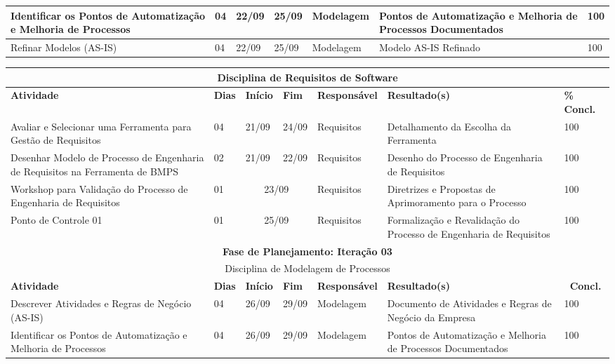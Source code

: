 \begin{landscape}
\begin{center}
\begin{tabular}{|m{6cm}|m{1cm}|m{1cm}|m{1cm}|m{4cm}|m{6cm}|m{2cm}|}
			Identificar os Pontos de Automatização e Melhoria de Processos & 04 & 22/09 & 25/09 & Modelagem & Pontos de Automatização e Melhoria de Processos Documentados & 100 \\ \hline
			Refinar Modelos (AS-IS) & 04 & 22/09 & 25/09 & Modelagem & Modelo AS-IS Refinado & 100 \\ \hline
			\end{tabular}
		\end{center}
		\begin{center}
			\begin{tabular}{|m{6cm}|m{1cm}|m{1cm}|m{1cm}|m{4cm}|m{6cm}|m{2cm}|}
			\hline
			\multicolumn{7}{|c|}{Disciplina de Requisitos de Software} \\
			\hline
			\textbf{Atividade} & \textbf{Dias} & \textbf{Início} & \textbf{Fim} & \textbf{Responsável} & \textbf{Resultado(s)} & \textbf{\% Concl.} \\ \hline
			Avaliar e Selecionar uma Ferramenta para Gestão de Requisitos & 04 & 21/09 & 24/09 & Requisitos & Detalhamento da Escolha da Ferramenta & 100 \\ \hline
			Desenhar Modelo de Processo de Engenharia de Requisitos na Ferramenta de BMPS & 02 & 21/09 & 22/09 & Requisitos & Desenho do Processo de Engenharia de Requisitos & 100 \\ \hline
			Workshop para Validação do Processo de Engenharia de Requisitos & 01 & \multicolumn{2}{c|}{23/09} & Requisitos & Diretrizes e Propostas de Aprimoramento para o Processo & 100 \\ \hline
			Ponto de Controle 01 & 01 & \multicolumn{2}{c|}{25/09} & Requisitos & Formalização e Revalidação do Processo de Engenharia de Requisitos & 100 \\ \hline
			\multicolumn{7}{|c|}{\textbf{Fase de Planejamento: Iteração 03}} \\
			\hline
			\multicolumn{7}{|c|}{Disciplina de Modelagem de Processos} \\
			\hline
			\textbf{Atividade} & \textbf{Dias} & \textbf{Início} & \textbf{Fim} & \textbf{Responsável} & \textbf{Resultado(s)} & \textbf{\ Concl.} \\ \hline
			Descrever Atividades e Regras de Negócio (AS-IS) & 04 & 26/09 & 29/09 & Modelagem & Documento de Atividades e Regras de Negócio da Empresa & 100 \\ \hline
			Identificar os Pontos de Automatização e Melhoria de Processos & 04 & 26/09 & 29/09 & Modelagem & Pontos de Automatização e Melhoria de Processos Documentados & 100 \\ \hline

\end{tabular}
\end{center}
\end{landscape}
